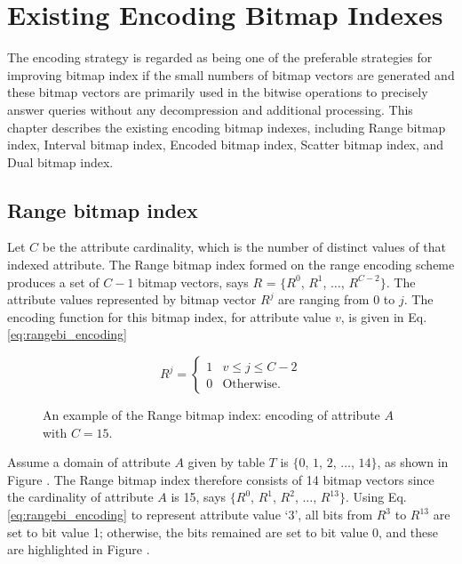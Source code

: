 \documentclass[../main/thesis.tex]{subfiles}
\begin{document}
\chapter{Existing Encoding Bitmap Indexes}
\label{ch:1}

The encoding strategy is regarded as being one of the preferable strategies for improving bitmap index if the small numbers of bitmap vectors are generated and these bitmap vectors are primarily used in the bitwise operations to precisely answer queries without any decompression and additional processing. This chapter describes the existing encoding bitmap indexes, including Range bitmap index, Interval bitmap index, Encoded bitmap index, Scatter bitmap index, and Dual bitmap index.

\section{Range bitmap index}
Let $C$ be the attribute cardinality, which is the number of distinct values of that indexed attribute. The Range bitmap index formed on the range encoding scheme \cite{RangeBI} produces a set of $C-1$ bitmap vectors, says $R$ = $\{R^0$, $R^1$, $\dots$, $R^{C-2}\}$. The attribute values represented by bitmap vector $R^j$ are ranging from 0 to $j$. The encoding function for this bitmap index, for attribute value $v$, is given in Eq. \eqref{eq:rangebi_encoding}

\begin{equation}
\label{eq:rangebi_encoding}
R^j=
\begin{cases}
1 & v \leq j \leq C-2 \\
0 & \text{Otherwise}.
\end{cases}
\end{equation}


\begin{figure}[!ht]
	\centering
	\hfil
	\caption{An example of the Range bitmap index: encoding of attribute $A$ with $C=15$.}
	\label{fig:example_range}
\end{figure}

Assume a domain of attribute $A$ given by table $T$ is $\{0$, $1$, $2$, $\dots$, $14\}$, as shown in Figure . The Range bitmap index therefore consists of 14 bitmap vectors since the cardinality of attribute $A$ is 15, says $\{R^0$, $R^1$, $R^2$, $\dots$, $R^{13}\}$. Using Eq. \eqref{eq:rangebi_encoding} to represent attribute value `3', all bits from $R^3$ to $R^{13}$ are set to bit value 1; otherwise, the bits remained are set to bit value 0, and these are highlighted in Figure .
\end{document}
